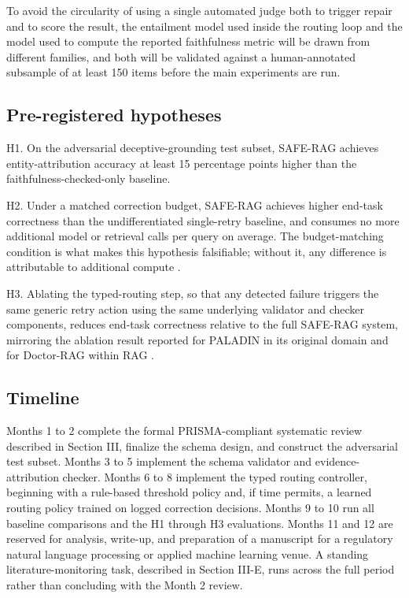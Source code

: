 \documentclass[10pt,twocolumn,letterpaper]{article}
\begin{document}
To avoid the circularity of using a single automated judge both to trigger repair and to score the result, the entailment model used inside the routing loop and the model used to compute the reported faithfulness metric will be drawn from different families, and both will be validated against a human-annotated subsample of at least 150 items before the main experiments are run.

\subsection{Pre-registered hypotheses}

H1. On the adversarial deceptive-grounding test subset, SAFE-RAG achieves entity-attribution accuracy at least 15 percentage points higher than the faithfulness-checked-only baseline.

H2. Under a matched correction budget, SAFE-RAG achieves higher end-task correctness than the undifferentiated single-retry baseline, and consumes no more additional model or retrieval calls per query on average. The budget-matching condition is what makes this hypothesis falsifiable; without it, any difference is attributable to additional compute \cite{budgetrepair}.

H3. Ablating the typed-routing step, so that any detected failure triggers the same generic retry action using the same underlying validator and checker components, reduces end-task correctness relative to the full SAFE-RAG system, mirroring the ablation result reported for PALADIN in its original domain \cite{paladin} and for Doctor-RAG within RAG \cite{doctorrag}.

\subsection{Timeline}

Months 1 to 2 complete the formal PRISMA-compliant systematic review described in Section III, finalize the schema design, and construct the adversarial test subset. Months 3 to 5 implement the schema validator and evidence-attribution checker. Months 6 to 8 implement the typed routing controller, beginning with a rule-based threshold policy and, if time permits, a learned routing policy trained on logged correction decisions. Months 9 to 10 run all baseline comparisons and the H1 through H3 evaluations. Months 11 and 12 are reserved for analysis, write-up, and preparation of a manuscript for a regulatory natural language processing or applied machine learning venue. A standing literature-monitoring task, described in Section III-E, runs across the full period rather than concluding with the Month 2 review.
\end{document}
